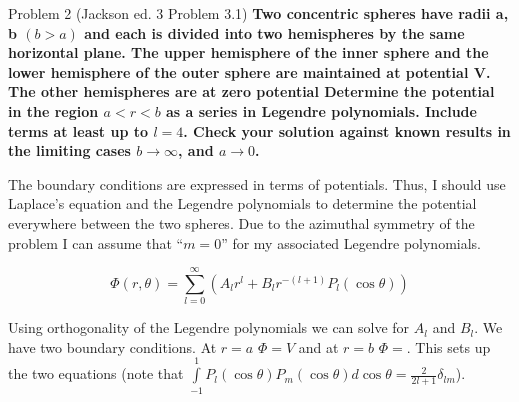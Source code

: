 \begin{homeworkProblem}{Problem 2 (Jackson ed. 3 Problem 3.1)}
\textbf{Two concentric spheres have radii a, b $(b > a)$ and each is divided into two hemispheres by the same horizontal plane. The upper hemisphere of the inner sphere and the lower hemisphere of the outer sphere are maintained at potential V. The other hemispheres are at zero potential Determine the potential in the region $a < r < b$ as a series in Legendre polynomials. Include terms at least up to $l = 4$. Check your solution against known results in the limiting cases $b \rightarrow \infty$, and $a \rightarrow 0$. } \\
\par
The boundary conditions are expressed in terms of potentials. Thus, I should use Laplace's equation and the Legendre polynomials to determine the potential everywhere between the two spheres. Due to the azimuthal symmetry of the problem I can assume that ``$m = 0$'' for my associated Legendre polynomials.

\[
\Phi(r,\theta) = \sum\limits_{l = 0}^{\infty} \left( A_l r^l + B_l r^{-(l+1)} P_l(\cos\theta) \right)
\]

Using orthogonality of the Legendre polynomials we can solve for $A_l$ and $B_l$. We have two boundary conditions. At $r = a$ $\Phi = V$ and at $r = b$ $\Phi = $. This sets up the two equations (note that $\int\limits_{-1}^1 P_l(\cos \theta)P_m(\cos \theta) d\cos\theta = \frac{2}{2l + 1} \delta_{l m}$). 


\end{homeworkProblem}

